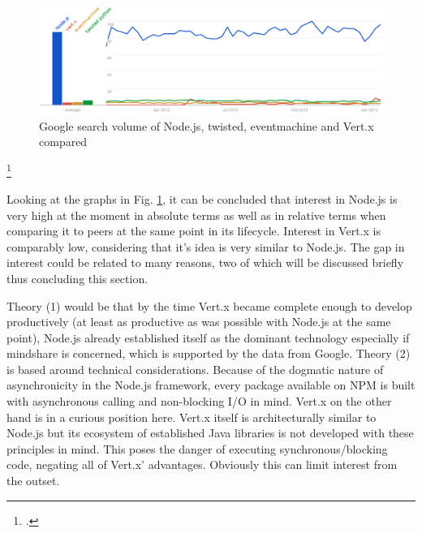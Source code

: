 
\begin{figure}[hbtp]
\centering
\includegraphics[width=\textwidth]{img/googletrend_all.png}
\caption[Google search volume of Node.js, twisted, eventmachine and Vert.x compared]{Google search volume of Node.js, twisted, eventmachine and Vert.x compared}
\label{img_googletrend_all}
\end{figure}
\footcitetext[Cf.][]{g_trends}

Looking at the graphs in Fig. \ref{img_googletrend_all}, it can be
concluded that interest in Node.js is very high at the moment in absolute terms as well
as in relative terms when comparing it to peers at the same point in its lifecycle.
Interest in Vert.x is comparably low, considering that it's idea is very similar to Node.js.
The gap in interest could be related to many reasons, two of which will be discussed 
briefly thus concluding this section.

Theory (1) would be that by the time Vert.x became complete enough to develop
productively (at least as productive as was possible with Node.js at the same
point), Node.js already established itself as the dominant technology especially if
mindshare is concerned, which is supported by the data from Google.
Theory (2) is based around technical considerations. Because of the dogmatic
nature of asynchronicity in the Node.js framework, every package available on
NPM is built with asynchronous calling
and non-blocking I/O in mind. Vert.x on the
other hand is in a curious position here. Vert.x itself is architecturally
similar to Node.js but its ecosystem of established Java libraries is not developed
with these principles in mind. This poses the danger of executing
synchronous/blocking code, negating all of Vert.x' advantages. Obviously this
can limit interest from the outset.

